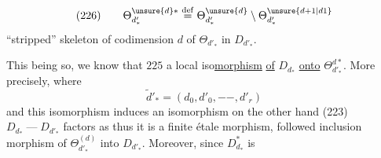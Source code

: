 
\[
(226)\qquad
\Theta_{d'_*}^{\unsure{d}*}\overset{\mathrm{def}}=
\Theta_{d'_*}^{\unsure{d}}\setminus
\Theta_{d'_*}^{\unsure{d+1|d1}}
\]
``stripped'' skeleton of codimension $d$ of
$\Theta_{d'_*}$ in $D_{d'_*}$.

This being so, we know that $225$ 
a  local iso\uline{morphism}
\uline{of} $D_{d_*}$ \uline{onto}
$\Theta_{d'_*}^{d*}$. More
precisely, 
where 
\[
\widetilde d'_*=(d_0,d'_0,-\!-,d'_r)
\]
and this isomorphism induces an isomorphism
on the other hand (223)
$D_{d_*}\mathrel{\text{---}}D_{d'_*}$ factors
as
thus it is a finite étale morphism,
followed   inclusion morphism of
$\Theta_{d'_*}^{(d)}$ into $D_{d'_*}$. Moreover, since $D_{d_*}^{*}$ is
\margin{136}
